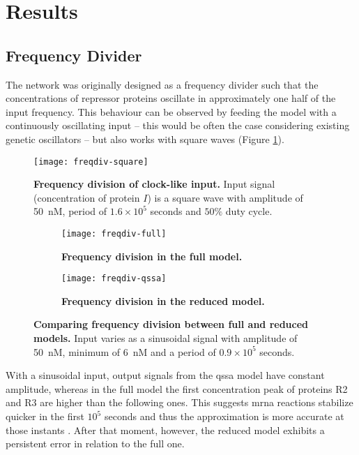 \section{Results}

  \subsection{Frequency Divider}\label{sec:freq-div}

    The network was originally designed as a frequency divider such that the concentrations of repressor proteins oscillate in approximately one half of the input frequency.
    This behaviour can be observed by feeding the model with a continuously oscillating input -- this would be often the case considering existing genetic oscillators \cite{optoscillator} -- but also works with square waves (Figure \ref{fig:freqdiv-square}).

    \begin{figure}[!htbp]
      \centering
      \texttt{[image: freqdiv-square]}
      \caption{\textbf{Frequency division of clock-like input.} Input signal (concentration of protein $I$) is a square wave with amplitude of \SI{50}{\nano M}, period of $1.6 \times 10^5$ seconds and $50\%$ duty cycle.}
      \label{fig:freqdiv-square}
    \end{figure}

    \begin{figure}[!htbp]
      \centering
      \begin{subfigure}[t]{0.9\textwidth}
        \centering
        \texttt{[image: freqdiv-full]}
        \caption{\textbf{Frequency division in the full model.}}
        \label{fig:freqdiv-full}
      \end{subfigure}
      \begin{subfigure}[t]{0.9\textwidth}
        \centering
        \texttt{[image: freqdiv-qssa]}
        \caption{\textbf{Frequency division in the reduced model.}}
        \label{fig:freqdiv-qssa}
      \end{subfigure}
      \caption{\textbf{Comparing frequency division between full and reduced models.} Input varies as a sinusoidal signal with amplitude of \SI{50}{\nano M}, minimum of \SI{6}{\nano M} and a period of $0.9 \times 10^5$ seconds.}
      \label{fig:freqdiv-sine}
    \end{figure}

    With a sinusoidal input, output signals from the \ac{qssa} model have constant amplitude, whereas in the full model the first concentration peak of proteins R2 and R3 are higher than the following ones.
    This suggests \acs{mrna} reactions stabilize quicker in the first $10^5$ seconds and thus the approximation is more accurate at those instants \cite{ingalls}.
    After that moment, however, the reduced model exhibits a persistent error in relation to the full one.

